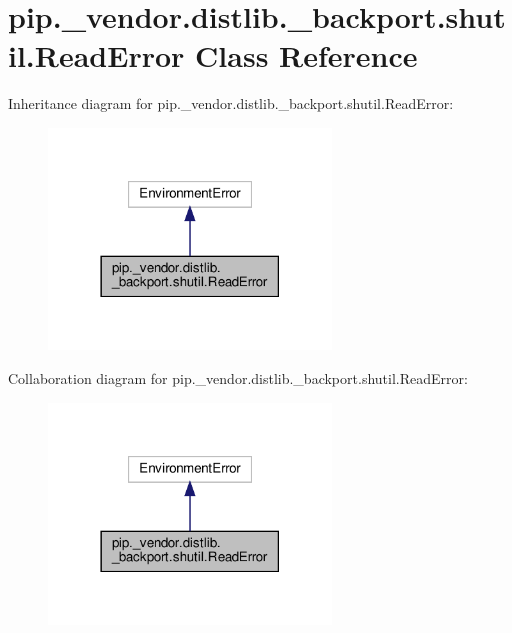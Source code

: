 \hypertarget{classpip_1_1__vendor_1_1distlib_1_1__backport_1_1shutil_1_1ReadError}{}\section{pip.\+\_\+vendor.\+distlib.\+\_\+backport.\+shutil.\+Read\+Error Class Reference}
\label{classpip_1_1__vendor_1_1distlib_1_1__backport_1_1shutil_1_1ReadError}


Inheritance diagram for pip.\+\_\+vendor.\+distlib.\+\_\+backport.\+shutil.\+Read\+Error\+:
\nopagebreak
\begin{figure}[H]
\begin{center}
\leavevmode
\includegraphics[width=213pt]{classpip_1_1__vendor_1_1distlib_1_1__backport_1_1shutil_1_1ReadError__inherit__graph}
\end{center}
\end{figure}


Collaboration diagram for pip.\+\_\+vendor.\+distlib.\+\_\+backport.\+shutil.\+Read\+Error\+:
\nopagebreak
\begin{figure}[H]
\begin{center}
\leavevmode
\includegraphics[width=213pt]{classpip_1_1__vendor_1_1distlib_1_1__backport_1_1shutil_1_1ReadError__coll__graph}
\end{center}
\end{figure}


